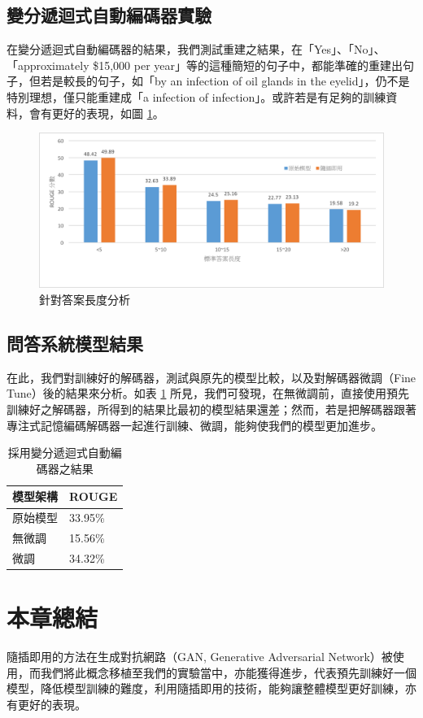 \subsection{變分遞迴式自動編碼器實驗}
在變分遞迴式自動編碼器的結果，我們測試重建之結果，在「Yes」、「No」、「approximately \$15,000 per year」等的這種簡短的句子中，都能準確的重建出句子，但若是較長的句子，如「by an infection of oil glands in the eyelid」，仍不是特別理想，僅只能重建成「a infection of infection」。或許若是有足夠的訓練資料，會有更好的表現，如圖 \ref{fig:chap5}。
\begin{figure}
    \centering
    \includegraphics[scale=0.7]{images/chap5.png}
    \caption{針對答案長度分析}\label{fig:chap5}
\end{figure}
\subsection{問答系統模型結果}
在此，我們對訓練好的解碼器，測試與原先的模型比較，以及對解碼器微調（Fine Tune）後的結果來分析。如表 \ref{table:vrae} 所見，我們可發現，在無微調前，直接使用預先訓練好之解碼器，所得到的結果比最初的模型結果還差；然而，若是把解碼器跟著專注式記憶編碼解碼器一起進行訓練、微調，能夠使我們的模型更加進步。%
\begin{table}[ht]
    \caption{採用變分遞迴式自動編碼器之結果} 
    \label{table:vrae}
    \centering
    \begin{tabular}{|l|l|}
        \hline
        模型架構 & ROUGE\\
        \hline
        原始模型 & 33.95\%\\
        \hline
        無微調 & 15.56\%\\%
        \hline
        微調 & 34.32\%\\%
        \hline
    \end{tabular}
\end{table}
\section{本章總結}
隨插即用的方法在生成對抗網路（GAN, Generative Adversarial Network）被使用，而我們將此概念移植至我們的實驗當中，亦能獲得進步，代表預先訓練好一個模型，降低模型訓練的難度，利用隨插即用的技術，能夠讓整體模型更好訓練，亦有更好的表現。%
